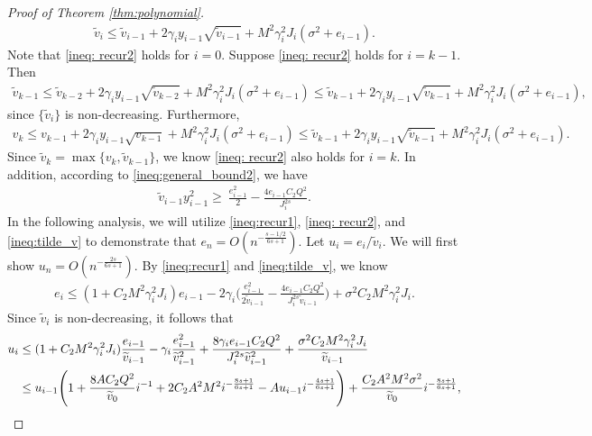 \begin{proof}[Proof of Theorem \ref{thm:polynomial}]
\begin{align}
    \tilde v_i \leq \tilde v_{i-1} + 2\gamma_iy_{i-1}\sqrt{\tilde v_{i-1}} + M^2\gamma_i^2J_i(\sigma^2 + e_{i-1}). \label{ineq: recur2}
\end{align}
Note that \eqref{ineq: recur2} holds for $i=0$. Suppose \eqref{ineq: recur2} holds for $i=k-1$. Then
\begin{align}
    \tilde v_{k-1} \leq \tilde v_{k-2} + 2\gamma_iy_{i-1}\sqrt{\tilde v_{k-2}} + M^2\gamma_i^2J_i(\sigma^2 + e_{i-1}) \leq \tilde v_{k-1} + 2\gamma_iy_{i-1}\sqrt{\tilde v_{k-1}} + M^2\gamma_i^2J_i(\sigma^2 + e_{i-1}), 
\end{align}
since $\{\tilde v_i\}$ is non-decreasing. Furthermore,
\begin{align*}
    v_k \leq  v_{k-1} + 2\gamma_iy_{i-1}\sqrt{v_{k-1}} + M^2\gamma_i^2J_i(\sigma^2 + e_{i-1})   \leq \tilde v_{k-1} + 2\gamma_iy_{i-1}\sqrt{\tilde v_{k-1}} + M^2\gamma_i^2J_i(\sigma^2 + e_{i-1}).
\end{align*}
Since $\tilde v_k = \max\{v_k, \tilde v_{k-1}\}$, we know \eqref{ineq: recur2} also holds for $i=k$. In addition, according to \eqref{ineq:general_bound2}, we have
\begin{align}
\tilde v_{i-1}y_{i-1}^2
\geq~\frac{e_{i-1}^2}{2} - \frac{4e_{i-1}C_2Q^2}{J_i^{2s}}. \label{ineq:tilde_v}
\end{align}
In the following analysis, we will utilize \eqref{ineq:recur1}, \eqref{ineq: recur2}, and \eqref{ineq:tilde_v} to demonstrate that $e_n = O\left(n^{-\frac{s-1/2}{6s+1}}\right)$. Let $u_i = e_i/\tilde v_i$. We will first show $u_n = O\left(n^{-\frac{2s}{6s+1}}\right)$. By \eqref{ineq:recur1} and \eqref{ineq:tilde_v}, we know 
\begin{align*}
    e_{i} \leq (1+C_2M^2\gamma_i^2J_i)e_{i-1} - 2\gamma_i\Bigg( \frac{e_{i-1}^2}{2\tilde v_{i-1}} - \frac{4e_{i-1}C_2Q^2}{J_i^{2s}\tilde v_{i-1}}\Bigg) + \sigma^2C_2M^2\gamma_i^2J_i.
\end{align*}
Since $\tilde v_i$ is non-decreasing, it follows that
\begin{align}
    u_i &\leq  (1+C_2M^2\gamma_i^2J_i)\frac{e_{i-1}}{\tilde v_{i-1}} - \gamma_i \frac{e_{i-1}^2}{\tilde v_{i-1}^2} + \frac{8\gamma_ie_{i-1}C_2Q^2}{J_i^{2s}\tilde v_{i-1}^2} + \frac{\sigma^2C_2M^2\gamma_i^2J_i}{\tilde v_{i-1}}\notag\\
    &\leq u_{i-1}\Bigg(1+ \frac{8AC_2Q^2}{\tilde v_0 }i^{-1} + 2C_2A^2M^2i^{-\frac{8s+1}{6s+1}} - Au_{i-1}i^{-\frac{4s+1}{6s+1}}\Bigg) + \frac{C_2A^2M^2\sigma^2}{\tilde v_0 } i^{-\frac{8s+1}{6s+1}}, \label{ineq:u1} 
\end{align}

\end{proof}

